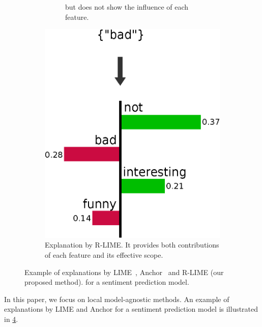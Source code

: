 \documentclass[11pt]{article}
\begin{document}
\begin{figure}[tbp]
\begin{subfigure}[t]{0.45\textwidth}
\begin{subfigure}[t]{\textwidth}
{				but does not show the influence of each feature.
			}\label{fig:example-anchor}
		\end{subfigure}
	\end{subfigure}
	\hspace{0.3cm}
	\begin{subfigure}[t]{0.45\textwidth}
		\centering
		\ifnum{}
			\vspace{-1.79cm}
		\else
			\vspace{-2.24cm}
		\fi
		\includegraphics[scale=\scale]{example-rlime}
		\caption{%
			Explanation by R-LIME\@.
			It provides both contributions of each feature and
			its effective scope.
		}\label{fig:example-rlime}
	\end{subfigure}
	\caption[Example of explanations by LIME, Anchor and R-LIME]{%
		Example of explanations by LIME~\cite{ribeiro2016why},
		Anchor~\cite{ribeiro2018anchors} and R-LIME (our proposed method).
		for a sentiment prediction model.
	}\label{fig:example}
\end{figure}
In this paper,
we focus on local model-agnostic methods.
An example of explanations by LIME and Anchor
for a sentiment prediction model is illustrated in \cref{fig:example}.
\end{document}
